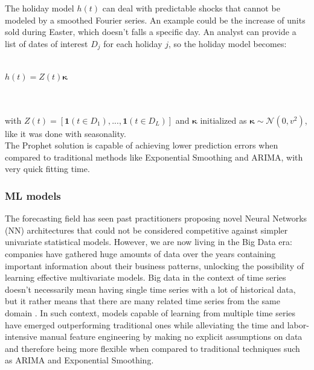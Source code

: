 \documentclass[a4paper, 12pt]{article} %
\begin{document}
	The holiday model $h(t)$ can deal with predictable shocks that cannot be modeled by a smoothed Fourier series.  An example could be the increase of units sold during Easter, which doesn't falls a specific day. An analyst can provide a list of dates of interest $D_j$ for each holiday $j$, so the holiday model becomes:\\\\
	\centerline{$h(t) = Z(t) \pmb{\kappa}$}\\\\
	with $Z(t) = [ \mathbf{1} (t \in D_1), ..., \mathbf{1} (t \in D_L)] $ and $\pmb{\kappa}$ initialized as $\pmb{\kappa} \sim \mathcal{N}(0, v^2)$, like it was done with seasonality.\\
	The Prophet solution is capable of achieving lower prediction errors when compared to traditional methods like Exponential Smoothing and ARIMA, with very quick fitting time.
	
	\subsubsection{ML models}
	The forecasting field has seen past practitioners proposing novel Neural Networks (NN) architectures that could not be considered competitive against simpler univariate statistical models. However, we are now living in the Big Data era: companies have gathered huge amounts of data over the years containing important information about their business patterns, unlocking the possibility of learning effective multivariate models. Big data in the context of time series doesn't necessarily mean having single time series with a lot of historical data, but it rather means that there are many related time series from the same domain \cite{RNNForecasting}. In such context, models capable of learning from multiple time series have emerged \cite{M5Competition} outperforming traditional ones while alleviating the time and labor-intensive manual feature engineering by making no explicit assumptions on data and therefore being more flexible when compared to traditional techniques such as ARIMA and Exponential Smoothing.
	
\end{document}
